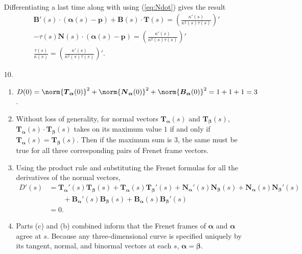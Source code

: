 \documentclass[a4paper,12pt]{article}
\newcommand{\bs}{\boldsymbol}
\theoremstyle{remark}
\begin{document}
\begin{enumerate}
\begin{gather}
        \end{gather}
        Differentiating a last time along with using (\ref{eq:Ndot}) gives the result
        \begin{gather*}
            \bs{B}'(s) \cdot (\bs{\alpha}(s) - \bs{p}) + \bs{B}(s) \cdot \bs{T}(s) = \left( \frac{\kappa'(s)}{\kappa^2(s)\tau(s)} \right)' \\
            -\tau(s)\bs{N}(s) \cdot (\bs{\alpha}(s) - \bs{p}) = \left( \frac{\kappa'(s)}{\kappa^2(s)\tau(s)} \right)' \\
            \frac{\tau(s)}{\kappa(s)} = \left( \frac{\kappa'(s)}{\kappa^2(s)\tau(s)} \right)'.
        \end{gather*}

    \item[10.]
        \begin{enumerate}
            \item
                $D(0) = \norm{\bs{T}_{\bs{\alpha}}(0)}^2 + \norm{\bs{N}_{\bs{\alpha}}(0)}^2 + \norm{\bs{B}_{\bs{\alpha}}(0)}^2 = 1 + 1 + 1 = 3$.
            \item
                Without loss of generality, for normal vectors $\bs{T}_{\bs{\alpha}}(s)$ and $\bs{T}_{\bs{\beta}}(s)$, $\bs{T}_{\bs{\alpha}}(s) \cdot \bs{T}_{\bs{\beta}}(s)$ takes on its maximum value $1$ if and only if $\bs{T}_{\bs{\alpha}}(s) = \bs{T}_{\bs{\beta}}(s)$. Then if the maximum sum is $3$, the same must be true for all three corresponding pairs of Frenet frame vectors.
            \item
                Using the product rule and substituting the Frenet formulas for all the derivatives of the normal vectors,
                \begin{align*}
                    D'(s) &= \bs{T}_{\bs{\alpha}}'(s) \bs{T}_{\bs{\beta}}(s) + \bs{T}_{\bs{\alpha}}(s) \bs{T}_{\bs{\beta}}'(s) + \bs{N}_{\bs{\alpha}}'(s) \bs{N}_{\bs{\beta}}(s) + \bs{N}_{\bs{\alpha}}(s) \bs{N}_{\bs{\beta}}'(s) \\
                    &\qquad+ \bs{B}_{\bs{\alpha}}'(s) \bs{B}_{\bs{\beta}}(s) + \bs{B}_{\bs{\alpha}}(s) \bs{B}_{\bs{\beta}}'(s) \\
                    &= 0.
                \end{align*}
            \item
                Parts (c) and (b) combined inform that the Frenet frames of $\bs{\alpha}$ and $\bs{\alpha}$ agree at $s$. Because any three-dimensional curve is specified uniquely by its tangent, normal, and binormal vectors at each $s$, $\bs{\alpha} = \bs{\beta}$.
        \end{enumerate}


\end{enumerate}
\end{document}
